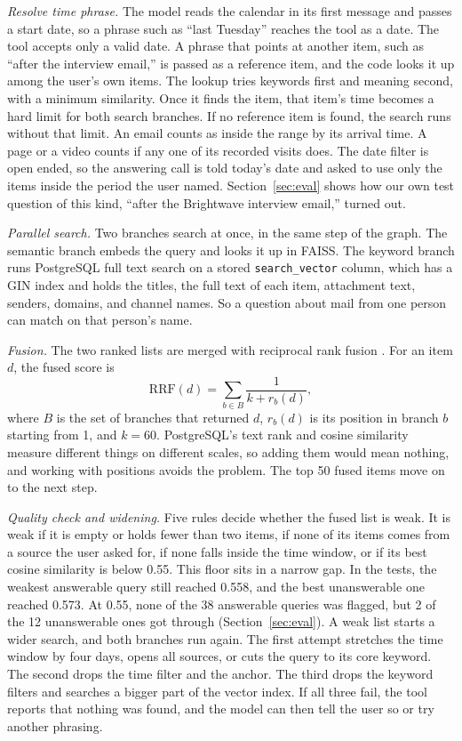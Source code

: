 \documentclass[conference]{IEEEtran}
\begin{document}
\textit{Resolve time phrase.} The model reads the calendar in its first message and passes a start date, so a phrase such as ``last Tuesday'' reaches the tool as a date. The tool accepts only a valid date. A phrase that points at another item, such as ``after the interview email,'' is passed as a reference item, and the code looks it up among the user's own items. The lookup tries keywords first and meaning second, with a minimum similarity. Once it finds the item, that item's time becomes a hard limit for both search branches. If no reference item is found, the search runs without that limit. An email counts as inside the range by its arrival time. A page or a video counts if any one of its recorded visits does. The date filter is open ended, so the answering call is told today's date and asked to use only the items inside the period the user named. Section~\ref{sec:eval} shows how our own test question of this kind, ``after the Brightwave interview email,'' turned out.

\textit{Parallel search.} Two branches search at once, in the same step of the graph. The semantic branch embeds the query and looks it up in FAISS. The keyword branch runs PostgreSQL full text search on a stored \texttt{search\_vector} column, which has a GIN index and holds the titles, the full text of each item, attachment text, senders, domains, and channel names. So a question about mail from one person can match on that person's name.

\textit{Fusion.} The two ranked lists are merged with reciprocal rank fusion \cite{b9}. For an item $d$, the fused score is
\begin{equation}
\mathrm{RRF}(d) = \sum_{b \in B} \frac{1}{k + r_b(d)}, \label{eq:rrf}
\end{equation}
where $B$ is the set of branches that returned $d$, $r_b(d)$ is its position in branch $b$ starting from 1, and $k = 60$. PostgreSQL's text rank and cosine similarity measure different things on different scales, so adding them would mean nothing, and working with positions avoids the problem. The top 50 fused items move on to the next step.

\textit{Quality check and widening.} Five rules decide whether the fused list is weak. It is weak if it is empty or holds fewer than two items, if none of its items comes from a source the user asked for, if none falls inside the time window, or if its best cosine similarity is below 0.55. This floor sits in a narrow gap. In the tests, the weakest answerable query still reached 0.558, and the best unanswerable one reached 0.573. At 0.55, none of the 38 answerable queries was flagged, but 2 of the 12 unanswerable ones got through (Section~\ref{sec:eval}). A weak list starts a wider search, and both branches run again. The first attempt stretches the time window by four days, opens all sources, or cuts the query to its core keyword. The second drops the time filter and the anchor. The third drops the keyword filters and searches a bigger part of the vector index. If all three fail, the tool reports that nothing was found, and the model can then tell the user so or try another phrasing.
\end{document}
